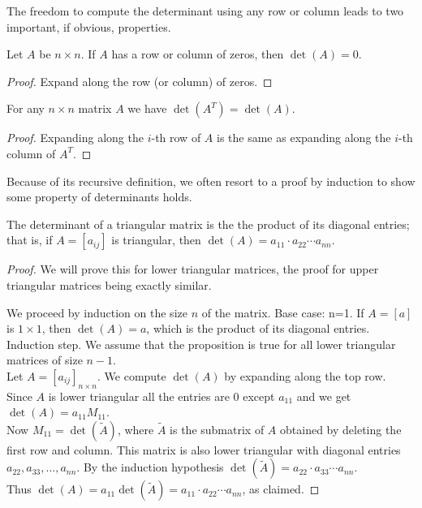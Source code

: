 \begin{frame}
The freedom to compute the determinant using any row or column leads to two important, if obvious, properties.
\pause\begin{theorem}
Let $A$ be $n\times n$. If $A$ has a row or column of zeros, then $\det(A)=0$. 
\end{theorem}
\pause
\begin{proof}
Expand along the row (or column) of zeros. 
\end{proof}
\pause\begin{theorem}
For any $n\times n$ matrix $A$ we have $\det(A^T)=\det(A)$. \end{theorem}
\pause\begin{proof}
Expanding along the $i$-th row of $A$ is the same as expanding along the $i$-th column of $A^T$. 
\end{proof}
\end{frame}
\begin{frame}
\footnotesize
Because of its recursive definition, we often resort to a proof by induction to show some property of determinants holds. 
\pause
\begin{theorem}
The determinant of a triangular matrix is the the product of its diagonal entries; that is, if $A=[a_{ij}]$ is triangular, then $\det(A)=a_{11}\cdot a_{22}\cdots a_{nn}$.  
\end{theorem}
\pause\begin{proof}
We will prove this for lower triangular matrices, the proof for upper triangular matrices being exactly similar. 

We proceed by induction on the size $n$ of the matrix. 
\bpause
\alert{Base case: n=1.} If $A=[a]$ is $1\times 1$, then $\det(A)=a$, which is the product of its diagonal entries. 
\bpause
\alert{Induction step.} We assume that the proposition is true for \alert{all} lower triangular matrices of size $n-1$. 
\\
\pause Let $A=[a_{ij}]_{n\times n}$. We compute $\det(A)$ by expanding along the top row. Since $A$ is lower triangular all the entries are 0 except $a_{11}$ and we get $\det(A)=a_{11}M_{11}$. 
\\
\pause Now $M_{11}=\det(\tilde{A})$, where $\tilde{A}$ is the submatrix of $A$ obtained by deleting the first row and column. This matrix is also lower triangular with diagonal entries $a_{22},a_{33},\dots, a_{nn}$. By the induction hypothesis $\det(\tilde{A})=a_{22}\cdot a_{33}\cdots a_{nn}$. 
\\
\pause Thus $\det(A)=a_{11}\det(\tilde{A})=a_{11}\cdot a_{22}\cdots a_{nn}$, as claimed.   
\end{proof}
\end{frame}
